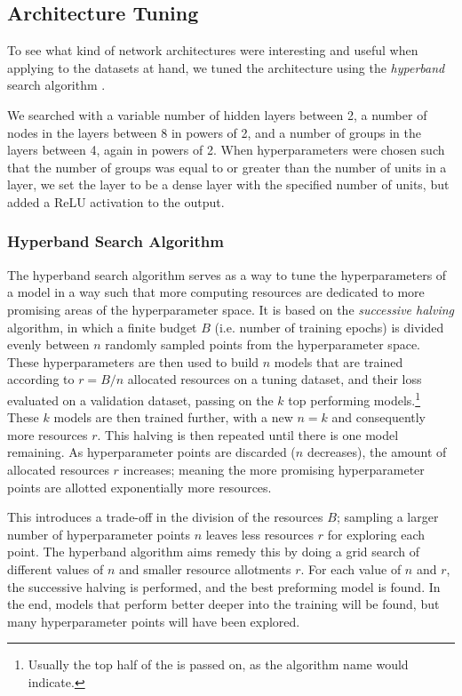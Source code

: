 \subsection{Architecture Tuning}
    To see what kind of network architectures were interesting and useful when applying to the datasets at hand, we tuned the architecture using the \textit{hyperband} search algorithm \citep{Hyperband}.

    We searched with a variable number of hidden layers between 2, a number of nodes in the layers between 8 in powers of 2, and a number of groups in the layers between 4, again in powers of 2. When hyperparameters were chosen such that the number of groups was equal to or greater than the number of units in a layer, we set the layer to be a dense layer with the specified number of units, but added a ReLU activation to the output.

    \subsubsection{Hyperband Search Algorithm}
        The hyperband search algorithm serves as a way to tune the hyperparameters of a model in a way such that more computing resources are dedicated to more promising areas of the hyperparameter space. It is based on the \textit{successive halving} algorithm, in which a finite budget $B$ (i.e. number of training epochs) is divided evenly between $n$ randomly sampled points from the hyperparameter space. These hyperparameters are then used to build $n$ models that are trained according to $r = B/n$ allocated resources on a tuning dataset, and their loss evaluated on a validation dataset, passing on the $k$ top performing models.\footnote{Usually the top half of the is passed on, as the algorithm name would indicate.} 
        These $k$ models are then trained further, with a new $n=k$ and consequently more resources $r$. This halving is then repeated until there is one model remaining. As hyperparameter points are discarded ($n$ decreases), the amount of allocated resources $r$ increases; meaning the more promising hyperparameter points are allotted exponentially more resources.

        This introduces a trade-off in the division of the resources $B$; sampling a larger number of hyperparameter points $n$ leaves less resources $r$ for exploring each point. The hyperband algorithm aims remedy this by doing a grid search of different values of $n$ and smaller resource allotments $r$. For each value of $n$ and $r$, the successive halving is performed, and the best preforming model is found. In the end, models that perform better deeper into the training will be found, but many hyperparameter points will have been explored.

